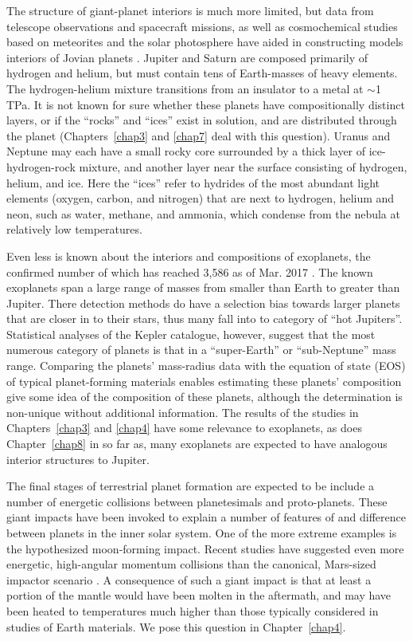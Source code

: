 The structure of giant-planet interiors is much more limited, but data from
telescope observations and spacecraft missions, as well as cosmochemical
studies based on meteorites and the solar photosphere have aided in
constructing models interiors of Jovian planets \cite{Guillot2004}. Jupiter and
Saturn are composed primarily of hydrogen and helium, but must contain tens of
Earth-masses of heavy elements. The hydrogen-helium mixture transitions from an
insulator to a metal at $\sim$1 TPa. It is not known for sure whether these
planets have compositionally distinct layers, or if the ``rocks'' and ``ices''
exist in solution, and are distributed through the planet (Chapters~\ref{chap3}
and \ref{chap7} deal with this question).  Uranus and Neptune may each have a
small rocky core surrounded by a thick layer of ice-hydrogen-rock mixture, and
another layer near the surface consisting of hydrogen, helium, and ice.  Here
the ``ices'' refer to hydrides of the most abundant light elements (oxygen,
carbon, and nitrogen) that are next to hydrogen, helium and neon, such as
water, methane, and ammonia, which condense from the nebula at relatively low
temperatures. 

Even less is known about the interiors and compositions of exoplanets, the
confirmed number of which has reached 3,586 as of Mar. 2017 \cite{Schneider2011}.
The known exoplanets span a large range of masses from smaller than Earth to
greater than Jupiter.  There detection methods do have a selection bias towards
larger planets that are closer in to their stars, thus many fall into to
category of ``hot Jupiters''. Statistical analyses of the Kepler catalogue,
however, suggest that the most numerous category of planets is that in a
``super-Earth'' or ``sub-Neptune''  mass range. Comparing the planets'
mass-radius data with the equation of state (EOS) of typical planet-forming
materials enables estimating these planets' composition \cite{Seager2007} give
some idea of the composition of these planets, although the determination is
non-unique without additional information. The results of the studies in
Chapters~\ref{chap3} and \ref{chap4} have some relevance to exoplanets, as does
Chapter~\ref{chap8} in so far as, many exoplanets are expected to have
analogous interior structures to Jupiter.

The final stages of terrestrial planet formation are expected to be include 
a number of energetic collisions between planetesimals and proto-planets. 
These giant impacts have been invoked to explain a number of features of and
difference between planets in the inner solar system. One of the more extreme
examples is the hypothesized moon-forming impact. Recent studies have suggested
even more energetic, high-angular momentum collisions \citep{Cuk2012,Canup2012} than the 
canonical, Mars-sized impactor scenario \citep{canup2004}. A consequence of 
such a giant impact is that at least a portion of the mantle would have been
molten in the aftermath, and may have been heated to temperatures
much higher than those typically considered in studies of Earth materials. 
We pose this question in Chapter~\ref{chap4}.

